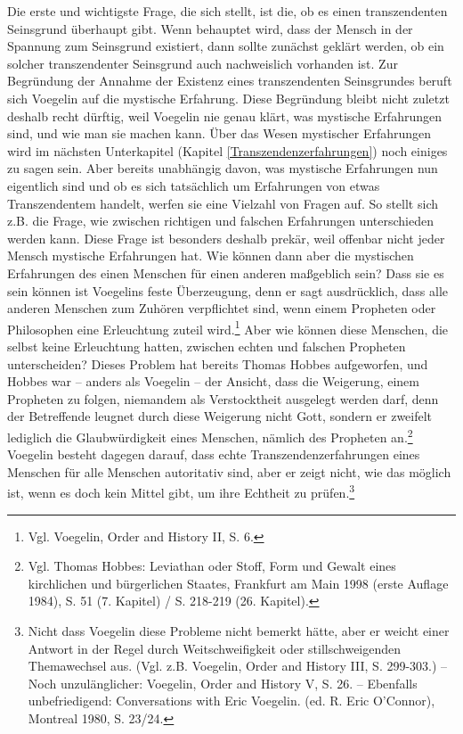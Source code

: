 Die erste und wichtigste Frage, die sich stellt, ist die, ob es einen
transzendenten Seinsgrund überhaupt gibt. Wenn behauptet wird, dass der Mensch
in der Spannung zum Seinsgrund existiert, dann sollte zunächst geklärt werden,
ob ein solcher transzendenter Seinsgrund auch nachweislich vorhanden ist. Zur
Begründung der Annahme der Existenz eines transzendenten Seinsgrundes beruft
sich Voegelin auf die mystische Erfahrung. Diese Begründung bleibt nicht
zuletzt deshalb recht dürftig, weil Voegelin nie genau klärt, was mystische
Erfahrungen sind, und wie man sie machen kann. Über das Wesen mystischer
Erfahrungen wird im nächsten Unterkapitel (Kapitel
\ref{Transzendenzerfahrungen}) noch einiges zu sagen sein. Aber bereits
unabhängig davon, was mystische Erfahrungen nun eigentlich sind und ob es sich
tatsächlich um Erfahrungen von etwas Transzendentem handelt, werfen sie eine
Vielzahl von Fragen auf. So stellt sich z.B. die Frage, wie zwischen richtigen
und falschen Erfahrungen unterschieden werden kann. Diese Frage ist besonders
deshalb prekär, weil offenbar nicht jeder Mensch mystische Erfahrungen hat.
Wie können dann aber die mystischen Erfahrungen des einen Menschen für einen
anderen maßgeblich sein?  Dass sie es sein können ist Voegelins feste
Überzeugung, denn er sagt ausdrücklich, dass alle anderen Menschen zum Zuhören
verpflichtet sind, wenn einem Propheten oder Philosophen eine Erleuchtung
zuteil wird.\footnote{Vgl.  Voegelin, Order and History II, S.  6.}  Aber wie
können diese Menschen, die selbst keine Erleuchtung hatten, zwischen echten
und falschen Propheten unterscheiden?  Dieses Problem hat bereits Thomas
Hobbes aufgeworfen, und Hobbes war -- anders als Voegelin -- der Ansicht, dass
die Weigerung, einem Propheten zu folgen, niemandem als Verstocktheit
ausgelegt werden darf, denn der Betreffende leugnet durch diese Weigerung
nicht Gott, sondern er zweifelt lediglich die Glaubwürdigkeit eines Menschen,
nämlich des Propheten an.\footnote{Vgl. Thomas Hobbes: Leviathan oder Stoff,
  Form und Gewalt eines kirchlichen und bürgerlichen Staates, Frankfurt am
  Main 1998 (erste Auflage 1984), S. 51 (7. Kapitel) / S.  218-219 (26.
  Kapitel).} Voegelin besteht dagegen darauf, dass echte
Transzendenzerfahrungen eines Menschen für alle Menschen autoritativ sind,
aber er zeigt nicht, wie das möglich ist, wenn es doch kein Mittel gibt, um
ihre Echtheit zu prüfen.\footnote{Nicht dass Voegelin diese Probleme nicht
  bemerkt hätte, aber er weicht einer Antwort in der Regel durch
  Weitschweifigkeit oder stillschweigenden Themawechsel aus.  (Vgl. z.B.
  Voegelin, Order and History III, S. 299-303.) -- Noch unzulänglicher:
  Voegelin, Order and History V, S.  26. -- Ebenfalls unbefriedigend:
  Conversations with Eric Voegelin. (ed. R.  Eric O'Connor), Montreal 1980, S.
  23/24.}

